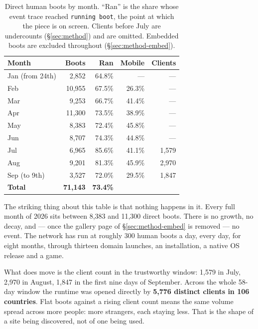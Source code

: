 \documentclass[10pt,letterpaper,twocolumn]{article}
\begin{document}
\begin{table}[t]
\centering
\footnotesize
\caption{Direct human boots by month. ``Ran'' is the share whose event trace reached \texttt{running boot}, the point at which the piece is on screen. Clients before July are undercounts (\S\ref{sec:method}) and are omitted. Embedded boots are excluded throughout (\S\ref{sec:method-embed}).}
\label{tab:months}
\vspace{0.35em}
\begin{tabular}{@{}l r r r r@{}}
\toprule
\textbf{Month} & \textbf{Boots} & \textbf{Ran} & \textbf{Mobile} & \textbf{Clients} \\
\midrule
Jan (from 24th) &  2,852 & 64.8\% & --- & --- \\
Feb             & 10,955 & 67.5\% & 26.3\% & --- \\
Mar             &  9,253 & 66.7\% & 41.4\% & --- \\
Apr             & 11,300 & 73.5\% & 38.9\% & --- \\
May             &  8,383 & 72.4\% & 45.8\% & --- \\
Jun             &  8,707 & 74.3\% & 44.8\% & --- \\
Jul             &  6,965 & 85.6\% & 41.1\% & 1,579 \\
Aug             &  9,201 & 81.3\% & 45.9\% & 2,970 \\
Sep (to 9th)    &  3,527 & 72.0\% & 29.5\% & 1,847 \\
\midrule
\textbf{Total}  & \textbf{71,143} & \textbf{73.4\%} & & \\
\bottomrule
\end{tabular}
\end{table}

The striking thing about this table is that nothing happens in it.
Every full month of 2026 sits between 8,383 and 11,300 direct boots.
There is no growth, no decay, and --- once the gallery page of
\S\ref{sec:method-embed} is removed --- no event. The network has run
at roughly 300 human boots a day, every day, for eight months, through
thirteen domain launches, an installation, a native OS release and a
game.

What does move is the client count in the trustworthy window: 1,579 in
July, 2,970 in August, 1,847 in the first nine days of September.
Across the whole 58-day window the runtime was opened directly by
\textbf{5,776 distinct clients in 106 countries}. Flat boots against a
rising client count means the same volume spread across more people:
more strangers, each staying less. That is the shape of a site being
discovered, not of one being used.
\end{document}
